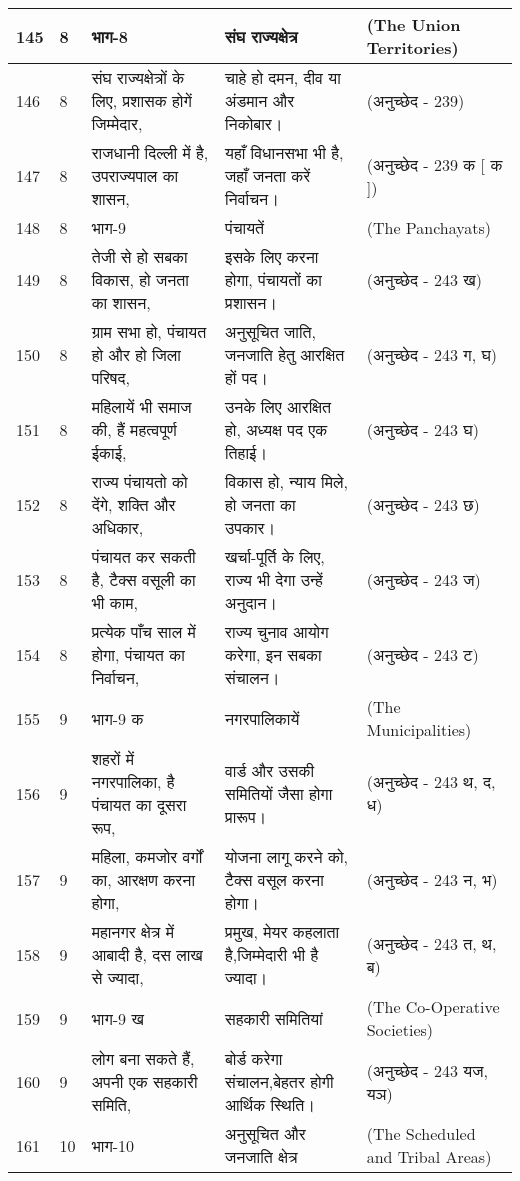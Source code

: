 \begin{longtable}{|l|l|l|l|l|}
145 & 8 & भाग-8 & संघ राज्यक्षेत्र & (The Union Territories) \\ \hline 
146 & 8 & संघ राज्यक्षेत्रों के लिए, प्रशासक होगें जिम्मेदार, & चाहे हो दमन, दीव या अंडमान और निकोबार। & (अनुच्छेद - 239) \\ \hline 
147 & 8 & राजधानी दिल्ली में है, उपराज्यपाल का शासन, & यहाँ विधानसभा भी है, जहाँ जनता करें निर्वाचन। & (अनुच्छेद - 239 क [ क ]) \\ \hline 
148 & 8 & भाग-9 & पंचायतें & (The Panchayats) \\ \hline 
149 & 8 & तेजी से हो सबका विकास, हो जनता का शासन, & इसके लिए करना होगा, पंचायतों का प्रशासन। & (अनुच्छेद - 243 ख) \\ \hline 
150 & 8 & ग्राम सभा हो, पंचायत हो और हो जिला परिषद, & अनुसूचित जाति, जनजाति हेतु आरक्षित हों पद। & (अनुच्छेद - 243 ग, घ) \\ \hline 
151 & 8 & महिलायें भी समाज की, हैं महत्वपूर्ण ईकाई, & उनके लिए आरक्षित हो, अध्यक्ष पद एक तिहाई। & (अनुच्छेद - 243 घ) \\ \hline 
152 & 8 & राज्य पंचायतो को देंगे, शक्ति और अधिकार, & विकास हो, न्याय मिले, हो जनता का उपकार। & (अनुच्छेद - 243 छ) \\ \hline 
153 & 8 & पंचायत कर सकती है, टैक्स वसूली का भी काम, & खर्चा-पूर्ति के लिए, राज्य भी देगा उन्हें अनुदान। & (अनुच्छेद - 243 ज) \\ \hline 
154 & 8 & प्रत्येक पाँच साल में होगा, पंचायत का निर्वाचन, & राज्य चुनाव आयोग करेगा, इन सबका संचालन। & (अनुच्छेद - 243 ट) \\ \hline 
155 & 9 & भाग-9 क & नगरपालिकायें & (The Municipalities) \\ \hline 
156 & 9 & शहरों में नगरपालिका, है पंचायत का दूसरा रूप, & वार्ड और उसकी समितियों जैसा होगा प्रारूप। & (अनुच्छेद - 243 थ, द, ध) \\ \hline 
157 & 9 & महिला, कमजोर वर्गों का, आरक्षण करना होगा, & योजना लागू करने को, टैक्स वसूल करना होगा। & (अनुच्छेद - 243 न, भ) \\ \hline 
158 & 9 & महानगर क्षेत्र में आबादी है, दस लाख से ज्यादा, & प्रमुख, मेयर कहलाता है,जिम्मेदारी भी है ज्यादा। & (अनुच्छेद - 243 त, थ, ब) \\ \hline 
159 & 9 & भाग-9 ख & सहकारी समितियां & (The Co-Operative Societies) \\ \hline 
160 & 9 & लोग बना सकते हैं, अपनी एक सहकारी समिति, & बोर्ड करेगा संचालन,बेहतर होगी आर्थिक स्थिति। & (अनुच्छेद - 243 यज, यञ) \\ \hline 
161 & 10 & भाग-10 & अनुसूचित और जनजाति क्षेत्र & (The Scheduled and Tribal Areas) \\ \hline 

\end{longtable}
